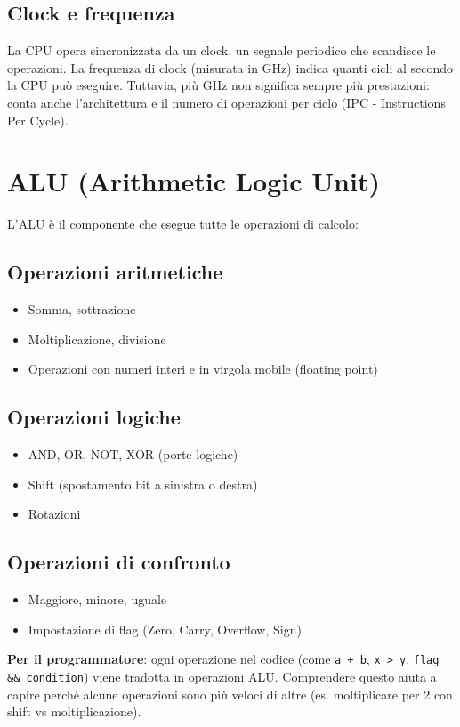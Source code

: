 \documentclass[12pt,a4paper]{article}
\begin{document}
\subsection{Clock e frequenza}
La CPU opera sincronizzata da un clock, un segnale periodico che scandisce le operazioni. La frequenza di clock (misurata in GHz) indica quanti cicli al secondo la CPU può eseguire. Tuttavia, più GHz non significa sempre più prestazioni: conta anche l'architettura e il numero di operazioni per ciclo (IPC - Instructions Per Cycle).

\section{ALU (Arithmetic Logic Unit)}
L'ALU è il componente che esegue tutte le operazioni di calcolo:

\subsection{Operazioni aritmetiche}
\begin{itemize}
    \item Somma, sottrazione
    \item Moltiplicazione, divisione
    \item Operazioni con numeri interi e in virgola mobile (floating point)
\end{itemize}

\subsection{Operazioni logiche}
\begin{itemize}
    \item AND, OR, NOT, XOR (porte logiche)
    \item Shift (spostamento bit a sinistra o destra)
    \item Rotazioni
\end{itemize}

\subsection{Operazioni di confronto}
\begin{itemize}
    \item Maggiore, minore, uguale
    \item Impostazione di flag (Zero, Carry, Overflow, Sign)
\end{itemize}

\textbf{Per il programmatore}: ogni operazione nel codice (come \texttt{a + b}, \texttt{x > y}, \texttt{flag \&\& condition}) viene tradotta in operazioni ALU. Comprendere questo aiuta a capire perché alcune operazioni sono più veloci di altre (es. moltiplicare per 2 con shift vs moltiplicazione).
\end{document}
